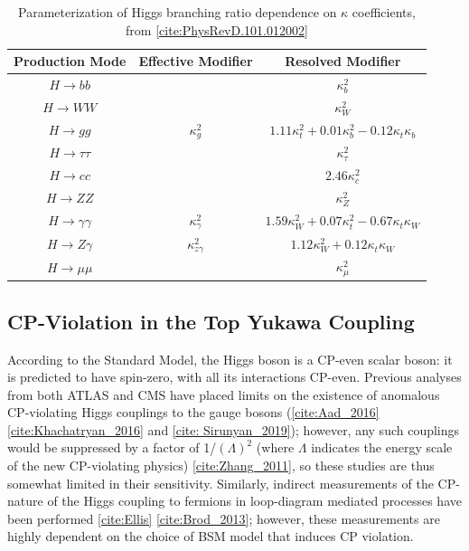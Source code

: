 \begin{table}[h]
    \centering
    \begin{tabular}{ccc}
	Production Mode & Effective Modifier & Resolved Modifier \\ \hline
	$H \rightarrow bb$ & & $\kappa_{b}^2$ \\
	$H \rightarrow WW$ & & $\kappa_{W}^{2}$ \\
	$H \rightarrow gg$ & $\kappa_{g}^{2}$ & $1.11 \kappa_{t}^{2} + 0.01 \kappa_{b}^2 - 0.12 \kappa_{t} \kappa_{b}$ \\
	$H \rightarrow \tau \tau$ & & $\kappa_{\tau}^{2}$ \\
	$H \rightarrow cc$ && $2.46 \kappa_{c}^{2}$ \\
	$H \rightarrow ZZ$ && $\kappa_{Z}^{2}$ \\
	$H \rightarrow \gamma \gamma$ & $\kappa_{\gamma}^{2}$ & $1.59 \kappa_{W}^{2} + 0.07 \kappa_{t}^2 - 0.67 \kappa_{t} \kappa_{W}$ \\
	$H \rightarrow Z \gamma$ & $\kappa_{z \gamma}^{2}$ & $1.12 \kappa_{W}^{2} + 0.12 \kappa_{t} \kappa_{W}$ \\
	$H \rightarrow \mu \mu$ && $\kappa_{\mu}^{2}$ \\
    \end{tabular}
    \caption{Parameterization of Higgs branching ratio dependence on $\kappa$ coefficients, from \ref{cite:PhysRevD.101.012002}}
    \label{BRskappa}
\end{table}

\subsection{CP-Violation in the Top Yukawa Coupling} \label{sec:CP-yukawa}

According to the Standard Model, the Higgs boson is a CP-even scalar boson: it is predicted to have spin-zero, with all its interactions CP-even. Previous analyses from both ATLAS and CMS have placed limits on the existence of anomalous CP-violating Higgs couplings to the gauge bosons (\ref{cite:Aad_2016} \ref{cite:Khachatryan_2016} and \ref{cite: Sirunyan_2019}); however, any such couplings would be suppressed by a factor of 1/$(\Lambda)^2$ (where $\Lambda$ indicates the energy scale of the new CP-violating physics) \ref{cite:Zhang_2011}, so these studies are thus somewhat limited in their sensitivity. Similarly, indirect measurements of the CP-nature of the Higgs coupling to fermions in loop-diagram mediated processes have been performed \ref{cite:Ellis} \ref{cite:Brod_2013}; however, these measurements are highly dependent on the choice of BSM model that induces CP violation.

